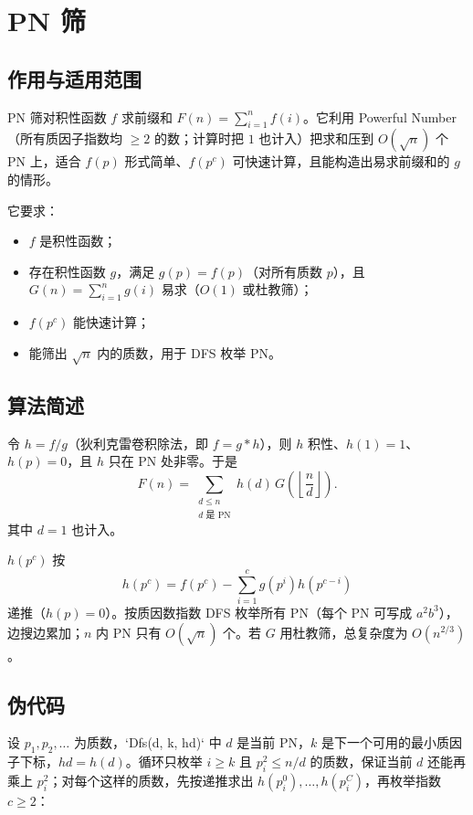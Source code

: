\section{PN 筛}\label{sec:powerful-number}

\subsection{作用与适用范围}

PN 筛对积性函数 $f$ 求前缀和 $F(n)=\sum_{i=1}^{n}f(i)$。它利用 Powerful Number（所有质因子指数均 $\ge2$ 的数；计算时把 $1$ 也计入）把求和压到 $O(\sqrt n)$ 个 PN 上，适合 $f(p)$ 形式简单、$f(p^c)$ 可快速计算，且能构造出易求前缀和的 $g$ 的情形。

它要求：
\begin{itemize}[leftmargin=1.8em, itemsep=0.15em, topsep=0.2em]
    \item $f$ 是积性函数；
    \item 存在积性函数 $g$，满足 $g(p)=f(p)$（对所有质数 $p$），且 $G(n)=\sum_{i=1}^{n}g(i)$ 易求（$O(1)$ 或杜教筛）；
    \item $f(p^c)$ 能快速计算；
    \item 能筛出 $\sqrt n$ 内的质数，用于 DFS 枚举 PN。
\end{itemize}

\subsection{算法简述}

令 $h=f/g$（狄利克雷卷积除法，即 $f=g*h$），则 $h$ 积性、$h(1)=1$、$h(p)=0$，且 $h$ 只在 PN 处非零。于是
$$
F(n)=\sum_{\substack{d\le n\\ d\text{ 是 PN}}}h(d)\,G\left(\left\lfloor\frac{n}{d}\right\rfloor\right).
$$
其中 $d=1$ 也计入。

$h(p^c)$ 按
$$
h(p^c)=f(p^c)-\sum_{i=1}^{c}g(p^i)h(p^{c-i})
$$
递推（$h(p)=0$）。按质因数指数 DFS 枚举所有 PN（每个 PN 可写成 $a^2b^3$），边搜边累加；$n$ 内 PN 只有 $O(\sqrt n)$ 个。若 $G$ 用杜教筛，总复杂度为 $O(n^{2/3})$。

\subsection{伪代码}

设 $p_1,p_2,\dots$ 为质数，`Dfs(d, k, hd)` 中 $d$ 是当前 PN，$k$ 是下一个可用的最小质因子下标，$hd=h(d)$。循环只枚举 $i\ge k$ 且 $p_i^2\le n/d$ 的质数，保证当前 $d$ 还能再乘上 $p_i^2$；对每个这样的质数，先按递推求出 $h(p_i^0),\dots,h(p_i^C)$，再枚举指数 $c\ge2$：

